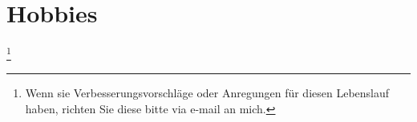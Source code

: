 \documentclass[11pt,a4paper,sans]{moderncv}        %
\newcommand\blfootnote[1]{%
  \begingroup
  \renewcommand\thefootnote{}\footnote{#1}%
  \addtocounter{footnote}{-1}%
  \endgroup
}
\renewcommand*{\bibliographyitemlabel}{[\arabic{enumiv}]}
\begin{document}
\section{Hobbies}




\blfootnote{Wenn sie Verbesserungsvorschläge oder Anregungen für diesen Lebenslauf haben, richten Sie diese bitte via e-mail an mich.}

\clearpage
\end{document}
